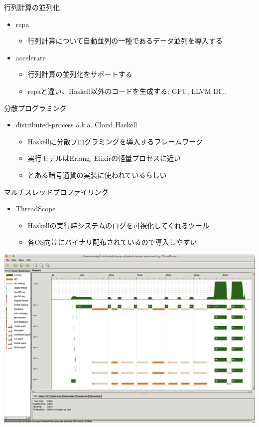 \documentclass[unicode,12pt]{beamer}
\begin{document}
\begin{frame}{行列計算の並列化}
  \begin{itemize}
  \item repa
    \begin{itemize}
      \item 行列計算について自動並列の一種であるデータ並列を導入する
    \end{itemize}
  \item accelerate
    \begin{itemize}
      \item 行列計算の並列化をサポートする
      \item repaと違い、Haskell以外のコードを生成する; GPU, LLVM IR,..
      \end{itemize}
  \end{itemize}
\end{frame}

\begin{frame}{分散プログラミング}
  \begin{itemize}
  \item distributed-process a.k.a. Cloud Haskell
    \begin{itemize}
    \item Haskellに分散プログラミングを導入するフレームワーク
    \item 実行モデルはErlang, Elixirの軽量プロセスに近い
    \item とある暗号通貨の実装に使われているらしい
    \end{itemize}
  \end{itemize}
\end{frame}

\begin{frame}{マルチスレッドプロファイリング}
  \begin{itemize}
  \item ThreadScope
    \begin{itemize}
    \item Haskellの実行時システムのログを可視化してくれるツール
    \item 各OS向けにバイナリ配布されているので導入しやすい
    \end{itemize}
  \end{itemize}
  \centering
  \includegraphics[width=.5\textwidth]{pic/threadscope.png}
\end{frame}
\end{document}

